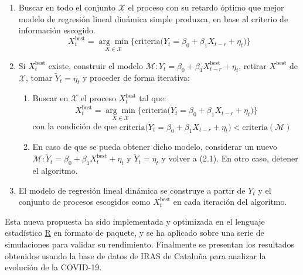\documentclass[12pt, a4paper, twoside]{article}
\begin{document}
\begin{enumerate}
    \item Buscar en todo el conjunto $\mathcal{X}$ el proceso con su retardo óptimo que mejor modelo de regresión lineal dinámica simple produzca, en base al criterio de información escogido. 
    \[ X^{\text{best}}_t = \underset{X\in\mathcal{X}}{\arg\min} \Big\{ \text{criteria}\big( Y_t = \beta_0 + \beta_1 X_{t-r} + \eta_t\big)\Big\} \] 
    \item Si $X^{\text{best}}_t$ existe, construir el modelo $\mathcal{M}: Y_t =  \beta_0 + \beta_1 X^{\text{best}}_{t-r} + \eta_t$, retirar $X^{\text{best}}$ de $\mathcal{X}$, tomar $\tilde{Y}_t=\eta_t$ y proceder de forma iterativa:
    \begin{enumerate}[label*=\arabic*.]
        \item Buscar en $\mathcal{X}$ el proceso  $X^{\text{best}}_t$ tal que:
        \[ X^{\text{best}}_t = \underset{X\in\mathcal{X}}{\arg\min} \Big\{ \text{criteria}\big( \tilde{Y}_t = \beta_0 + \beta_1 X_{t-r} + \eta_t\big)\Big\} \] 
        con la condición de que $\text{criteria}\big(\tilde{Y}_t = \beta_0 + \beta_1 X_{t-r} + \eta_t\big) < \text{criteria}(\mathcal{M})$
        \item En caso de que se pueda obtener dicho modelo, considerar un nuevo $\mathcal{M}: \tilde{Y}_t = \beta_0 + \beta_1 X^{\text{best}}_t + \eta_t$ y $\tilde{Y}_t = \eta_t$ y volver a (2.1). En otro caso, detener el algoritmo.
    \end{enumerate}
    \item El modelo de regresión lineal dinámica se construye a partir de  $Y_t$ y el conjunto de procesos escogidos como $ X^{\text{best}}_t$ en cada iteración del algoritmo.
\end{enumerate}

Esta nueva propuesta ha sido implementada y optimizada en el lenguaje estadístico \href{https://www.r-project.org/}{R} en formato de paquete, y se ha aplicado sobre una serie de simulaciones para validar su rendimiento. Finalmente se presentan los resultados obtenidos usando la base de datos de IRAS de Cataluña para analizar la evolución de la COVID-19. 





\end{document}
